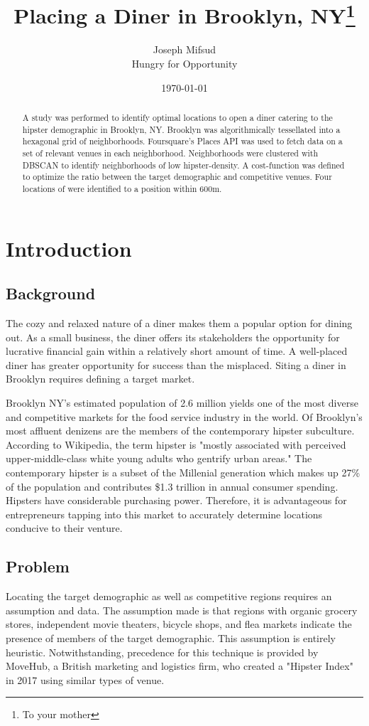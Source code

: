 \documentclass[12pt]{article}
\title{Placing a Diner in Brooklyn, NY\thanks{To your mother}}
\author{	Joseph Mifsud  \\
		Hungry for Opportunity}
\date{\today}
\begin{document}
\maketitle
\begin{abstract}

	A study was performed to identify optimal locations to open a diner catering to the hipster demographic in Brooklyn, NY. 
	Brooklyn was algorithmically tessellated into a hexagonal grid of neighborhoods. 
	Foursquare's Places API was used to fetch data on a set of relevant venues in each neighborhood. 
	Neighborhoods were clustered with DBSCAN to identify neighborhoods of low hipster-density. 
	A cost-function was defined to optimize the ratio between the target demographic and competitive venues.
	Four locations of were identified to a position within 600m.
\end{abstract}

\section{Introduction}
\subsection{Background}
	The cozy and relaxed nature of a diner makes them a popular option for dining out.
	As a small business, the diner offers its stakeholders the opportunity for lucrative financial gain within a relatively short amount of time.
	A well-placed diner has greater opportunity for success than the misplaced.
	Siting a diner in Brooklyn requires defining a target market.
	
	Brooklyn NY's estimated population of 2.6 million yields one of the most diverse and competitive markets for the food service industry in the world.
	Of Brooklyn's most affluent denizens are the members of the contemporary hipster subculture.
	According to Wikipedia, the term hipster is "mostly associated with perceived upper-middle-class white young adults who gentrify urban areas."
	The contemporary hipster is a subset of the Millenial generation which makes up 27\% of the population and contributes \$1.3 trillion in annual consumer spending.
	Hipsters have considerable purchasing power.
	Therefore, it is advantageous for entrepreneurs tapping into this market to accurately determine locations conducive to their venture.
	
\subsection{Problem}	
	Locating the target demographic as well as competitive regions requires an assumption and data.
	The assumption made is that regions with organic grocery stores, independent movie theaters, bicycle shops, and flea markets indicate the presence of members of the target demographic.
	This assumption is entirely heuristic.
	Notwithstanding, precedence for this technique is provided by MoveHub, a British marketing and logistics firm, who created a "Hipster Index" in 2017 using similar types of venue.
\end{document}
